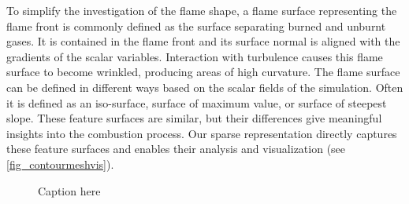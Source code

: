 To simplify the investigation of the flame shape, a flame surface representing
the flame front is commonly defined as the surface separating burned and unburnt
gases. It is contained in the flame front and its surface normal is aligned with
the gradients of the scalar variables.
%
%
Interaction with turbulence causes this flame surface to become wrinkled,
producing areas of high curvature. The flame surface can be defined in different
ways based on the scalar fields of the simulation. Often it is defined as an
iso-surface, surface of maximum value, or surface of steepest slope. These
feature surfaces are similar, but their differences give meaningful insights
into the combustion process. Our sparse representation directly captures these
feature surfaces and enables their analysis and visualization (see
\autoref{fig_contourmeshvis}).

\begin{figure}[tb]
    \centering
    \caption{Caption here}
    \label{fig:figure1}
\end{figure}


